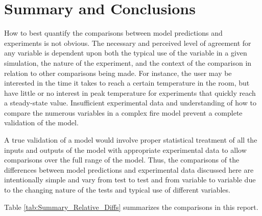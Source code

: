 \chapter{Summary and Conclusions}

How to best quantify the comparisons between model predictions and experiments is not obvious. The necessary and perceived level of agreement for any variable is dependent upon both the typical use of the variable in a given simulation, the nature of the experiment, and the context of the comparison in relation to other comparisons being made. For instance, the user may be interested in the time it takes to reach a certain temperature in the room, but have little or no interest in peak temperature for experiments that quickly reach a steady-state value. Insufficient experimental data and understanding of how to compare the numerous variables in a complex fire model prevent a complete validation of the model. 

A true validation of a model would involve proper statistical treatment of all the inputs and outputs of the model with appropriate experimental data to allow comparisons over the full range of the model. Thus, the comparisons of the differences between model predictions and experimental data discussed here are intentionally simple and vary from test to test and from variable to variable due to the changing nature of the tests and typical use of different variables.

Table \ref{tab:Summary_Relative_Diffs} summarizes the comparisons in this report.

